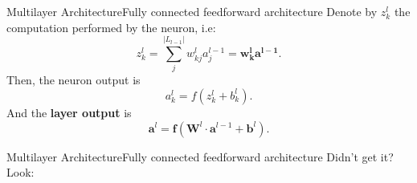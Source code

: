 \documentclass{beamer}
\begin{document}
        \begin{frame}{Multilayer Architecture}{Fully connected feedforward architecture}
                Denote by $z^l_k$
                the computation performed by the neuron, i.e:
                \[
                    z^l_k = \sum_j^{|L_{l-1}|} w^l_{kj}a^{l-1}_{j} = \mathbf{w^l_k}\mathbf{a^{l-1}}.
                \]
                Then, the neuron output is
                \[
                    a^l_k = f(z^l_k + b^l_k).
                \]
                And the \textbf{layer output} is
                \[
                    \mathbf{a}^l = \mathbf{f}(\mathbf{W}^l \cdot \mathbf{a}^{l-1} + \mathbf{b}^l).
                \]
        \end{frame}

        \begin{frame}{Multilayer Architecture}{Fully connected feedforward architecture}
                Didn't get it? Look: 


\end{frame}
\end{document}
